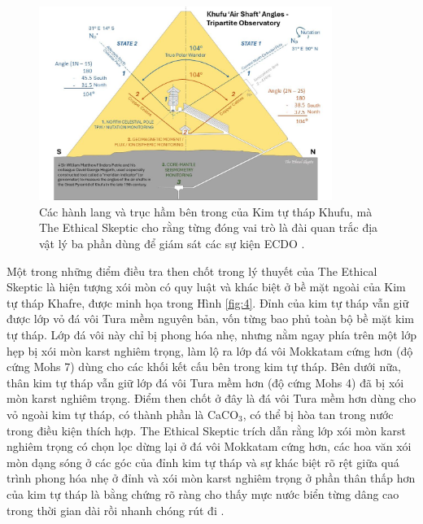 \documentclass[10pt,twocolumn,letterpaper]{article}
\begin{document}
\begin{figure}[t]
\begin{center}
\includegraphics[width=0.85\textwidth]{shafts.jpg}
\end{center}
   \caption{Các hành lang và trục hầm bên trong của Kim tự tháp Khufu, mà The Ethical Skeptic cho rằng từng đóng vai trò là đài quan trắc địa vật lý ba phần dùng để giám sát các sự kiện ECDO \cite{28}.}
\label{fig:5}
\end{figure}

Một trong những điểm điều tra then chốt trong lý thuyết của The Ethical Skeptic là hiện tượng xói mòn có quy luật và khác biệt ở bề mặt ngoài của Kim tự tháp Khafre, được minh họa trong Hình \ref{fig:4}. Đỉnh của kim tự tháp vẫn giữ được lớp vỏ đá vôi Tura mềm nguyên bản, vốn từng bao phủ toàn bộ bề mặt kim tự tháp. Lớp đá vôi này chỉ bị phong hóa nhẹ, nhưng nằm ngay phía trên một lớp hẹp bị xói mòn karst nghiêm trọng, làm lộ ra lớp đá vôi Mokkatam cứng hơn (độ cứng Mohs 7) dùng cho các khối kết cấu bên trong kim tự tháp. Bên dưới nữa, thân kim tự tháp vẫn giữ lớp đá vôi Tura mềm hơn (độ cứng Mohs 4) đã bị xói mòn karst nghiêm trọng. Điểm then chốt ở đây là đá vôi Tura mềm hơn dùng cho vỏ ngoài kim tự tháp, có thành phần là CaCO$_3$, có thể bị hòa tan trong nước trong điều kiện thích hợp. The Ethical Skeptic trích dẫn rằng lớp xói mòn karst nghiêm trọng có chọn lọc dừng lại ở đá vôi Mokkatam cứng hơn, các hoa văn xói mòn dạng sóng ở các góc của đỉnh kim tự tháp và sự khác biệt rõ rệt giữa quá trình phong hóa nhẹ ở đỉnh và xói mòn karst nghiêm trọng ở phần thân thấp hơn của kim tự tháp là bằng chứng rõ ràng cho thấy mực nước biển từng dâng cao trong thời gian dài rồi nhanh chóng rút đi \cite{27}.
\end{document}
